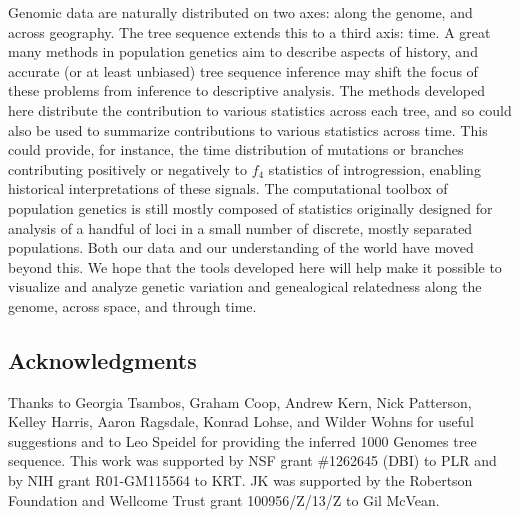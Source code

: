 \documentclass{article}
\begin{document}
Genomic data are naturally distributed on two axes: along the genome, and across geography.
The tree sequence extends this to a third axis: time.
A great many methods in population genetics aim to describe aspects of history,
and accurate (or at least unbiased) tree sequence inference
may shift the focus of these problems from inference to descriptive analysis.
The methods developed here distribute the contribution to various statistics across each tree,
and so could also be used to summarize contributions to various statistics across time.
This could provide, for instance, the time distribution of mutations or branches
contributing positively or negatively to $f_4$ statistics of introgression,
enabling historical interpretations of these signals.
The computational toolbox of population genetics
is still mostly composed of statistics originally designed for analysis of a handful of loci
in a small number of discrete, mostly separated populations.
Both our data and our understanding of the world have moved beyond this.
We hope that the tools developed here will help make it possible
to visualize and analyze genetic variation and genealogical relatedness
along the genome, across space, and through time.






\subsection*{Acknowledgments}
Thanks to Georgia Tsambos, Graham Coop, Andrew Kern, Nick Patterson, Kelley Harris,
Aaron Ragsdale, Konrad Lohse, and Wilder Wohns for useful suggestions
and to Leo Speidel for providing the inferred 1000 Genomes tree sequence.
This work was supported by NSF grant \#1262645 (DBI) to PLR
and by NIH grant R01-GM115564 to KRT. JK was supported by
the Robertson Foundation and Wellcome Trust grant 100956/Z/13/Z
to Gil McVean.
\end{document}
